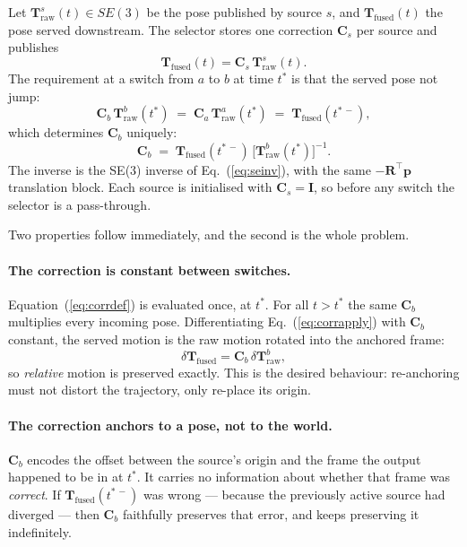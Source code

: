 Let $\mathbf{T}^{s}_{\text{raw}}(t) \in SE(3)$ be the pose published by
source $s$, and $\mathbf{T}_{\text{fused}}(t)$ the pose served downstream.
The selector stores one correction $\mathbf{C}_s$ per source and publishes
\begin{equation}
\mathbf{T}_{\text{fused}}(t) = \mathbf{C}_s\,\mathbf{T}^{s}_{\text{raw}}(t).
\label{eq:corrapply}
\end{equation}
The requirement at a switch from $a$ to $b$ at time $t^{\ast}$ is that the
served pose not jump:
\begin{equation}
\mathbf{C}_b\,\mathbf{T}^{b}_{\text{raw}}(t^{\ast})
  \;=\;
  \mathbf{C}_a\,\mathbf{T}^{a}_{\text{raw}}(t^{\ast})
  \;=\;
  \mathbf{T}_{\text{fused}}(t^{\ast\,-}),
\end{equation}
which determines $\mathbf{C}_b$ uniquely:
\begin{equation}
\boxed{\;
\mathbf{C}_b \;=\; \mathbf{T}_{\text{fused}}(t^{\ast\,-})\,
                   \bigl[\mathbf{T}^{b}_{\text{raw}}(t^{\ast})\bigr]^{-1}. \;}
\label{eq:corrdef}
\end{equation}
The inverse is the SE(3) inverse of Eq.~(\ref{eq:seinv}), with the same
$-\mathbf{R}^{\top}\mathbf{p}$ translation block. Each source is initialised
with $\mathbf{C}_s = \mathbf{I}$, so before any switch the selector is a
pass-through.

Two properties follow immediately, and the second is the whole problem.

\paragraph{The correction is constant between switches.}
Equation~(\ref{eq:corrdef}) is evaluated once, at $t^{\ast}$. For all
$t > t^{\ast}$ the same $\mathbf{C}_b$ multiplies every incoming pose.
Differentiating Eq.~(\ref{eq:corrapply}) with $\mathbf{C}_b$ constant, the
served motion is the raw motion rotated into the anchored frame:
\begin{equation}
\delta\mathbf{T}_{\text{fused}}
  = \mathbf{C}_b\,\delta\mathbf{T}^{b}_{\text{raw}},
\end{equation}
so \emph{relative} motion is preserved exactly. This is the desired
behaviour: re-anchoring must not distort the trajectory, only re-place its
origin.

\paragraph{The correction anchors to a pose, not to the world.}
$\mathbf{C}_b$ encodes the offset between the source's origin and the frame
the output happened to be in at $t^{\ast}$. It carries no information about
whether that frame was \emph{correct}. If $\mathbf{T}_{\text{fused}}
(t^{\ast\,-})$ was wrong --- because the previously active source had
diverged --- then $\mathbf{C}_b$ faithfully preserves that error, and keeps
preserving it indefinitely.

